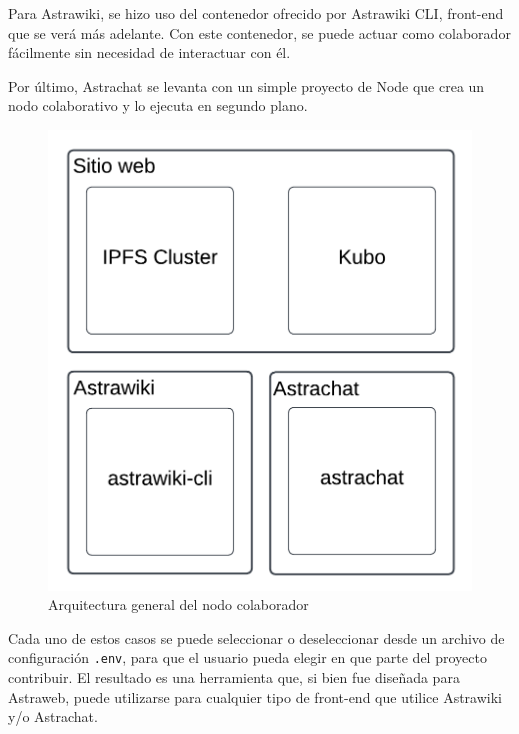 Para Astrawiki, se hizo uso del contenedor ofrecido por Astrawiki CLI, front-end que se verá más adelante. Con este contenedor, se puede actuar como colaborador fácilmente sin necesidad de interactuar con él.

Por último, Astrachat se levanta con un simple proyecto de Node que crea un nodo colaborativo y lo ejecuta en segundo plano.

\begin{figure}[H]
    \centering
    \includegraphics[width=0.5\linewidth]{img/solucion-ipfs/collaborator-arch.png}
    \caption{Arquitectura general del nodo colaborador}
    \label{fig:collaborator-architecture}
\end{figure}

Cada uno de estos casos se puede seleccionar o deseleccionar desde un archivo de configuración \texttt{.env}, para que el usuario pueda elegir en que parte del proyecto contribuir. El resultado es una herramienta que, si bien fue diseñada para Astraweb, puede utilizarse para cualquier tipo de front-end que utilice Astrawiki y/o Astrachat.